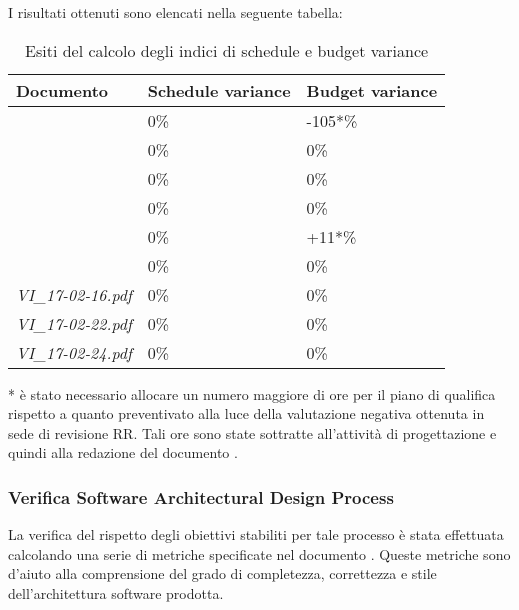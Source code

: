 		I risultati ottenuti sono elencati nella seguente tabella:	
		\begin{table}[H]
		\begin{tabular}{|l|l|l|}
		\hline
		\textbf{Documento} 		&\textbf{Schedule variance} &\textbf{Budget variance} 		\\
		\hline
		\PdQ 					&0\%		&-105*\%\\
		\NdP 					&0\%		&0\%\\
		\AdR 					&0\%		&0\%\\
		\PdP 					&0\%		&0\%\\
		\ST					&0\%		&+11*\%\\
		\Glossario 				&0\%		&0\%\\
		\textit{VI_17-02-16.pdf} 		&0\%		&0\%\\
		\textit{VI_17-02-22.pdf} 		&0\%		&0\%\\
		\textit{VI_17-02-24.pdf} 		&0\%		&0\%\\
		\hline
		\end{tabular}
		\caption{Esiti del calcolo degli indici di schedule e budget variance}
		\end{table}
		* è stato necessario allocare un numero maggiore di ore per il piano di qualifica rispetto a quanto preventivato alla luce della valutazione negativa ottenuta in sede di revisione RR. Tali ore sono state sottratte all'attività di progettazione e quindi alla redazione del documento \ST.
		
		\subsubsection{Verifica Software Architectural Design Process}
		La verifica del rispetto degli obiettivi stabiliti per tale processo è stata effettuata calcolando una serie di metriche specificate nel documento \NdP. Queste metriche sono d'aiuto alla comprensione del grado di completezza, correttezza e stile dell'architettura software prodotta.
		
